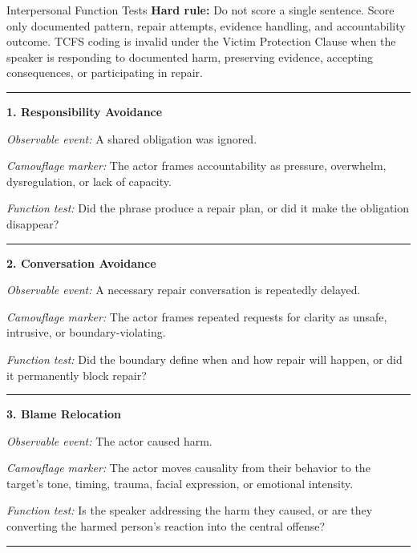 \documentclass[11pt, letterpaper]{article}
\newcommand{\term}[1]{\textbf{#1}}
\begin{document}
\needspace{0.75\textheight}
\begin{frameworkbox}{Interpersonal Function Tests}
\small
\term{Hard rule:} Do not score a single sentence. Score only documented pattern, repair attempts, evidence handling, and accountability outcome. TCFS coding is invalid under the Victim Protection Clause when the speaker is responding to documented harm, preserving evidence, accepting consequences, or participating in repair.

\vspace{0.5em}\hrule\vspace{0.7em}

\term{1. Responsibility Avoidance}

\textit{Observable event:} A shared obligation was ignored.

\textit{Camouflage marker:} The actor frames accountability as pressure, overwhelm, dysregulation, or lack of capacity.

\textit{Function test:} Did the phrase produce a repair plan, or did it make the obligation disappear?

\vspace{0.5em}\hrule\vspace{0.7em}

\term{2. Conversation Avoidance}

\textit{Observable event:} A necessary repair conversation is repeatedly delayed.

\textit{Camouflage marker:} The actor frames repeated requests for clarity as unsafe, intrusive, or boundary-violating.

\textit{Function test:} Did the boundary define when and how repair will happen, or did it permanently block repair?

\vspace{0.5em}\hrule\vspace{0.7em}

\term{3. Blame Relocation}

\textit{Observable event:} The actor caused harm.

\textit{Camouflage marker:} The actor moves causality from their behavior to the target's tone, timing, trauma, facial expression, or emotional intensity.

\textit{Function test:} Is the speaker addressing the harm they caused, or are they converting the harmed person's reaction into the central offense?

\vspace{0.5em}\hrule\vspace{0.7em}


\end{frameworkbox}
\end{document}
